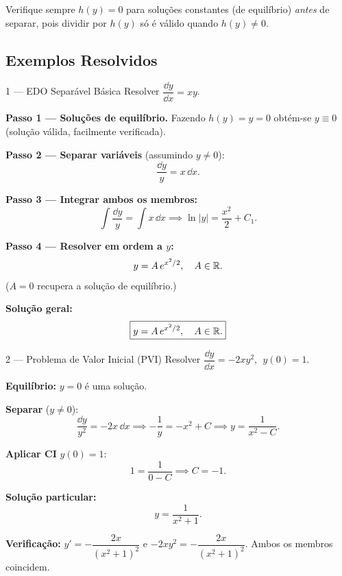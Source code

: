 \begin{tipbox}
  Verifique sempre $h(y)=0$ para soluções constantes (de equilíbrio) \emph{antes} de
  separar, pois dividir por $h(y)$ só é válido quando $h(y)\neq 0$.
\end{tipbox}

\subsection{Exemplos Resolvidos}

\begin{exbox}{1 --- EDO Separável Básica}
  Resolver $\dfrac{\dd y}{\dd x} = xy$.
\end{exbox}

\begin{solbox}
  \textbf{Passo 1 --- Soluções de equilíbrio.} Fazendo $h(y)=y=0$ obtém-se $y\equiv 0$
  (solução válida, facilmente verificada).

  \textbf{Passo 2 --- Separar variáveis} (assumindo $y\neq 0$):
  \[
    \frac{\dd y}{y} = x\,\dd x.
  \]

  \textbf{Passo 3 --- Integrar ambos os membros:}
  \[
    \int \frac{\dd y}{y} = \int x\,\dd x
    \implies \ln|y| = \frac{x^2}{2} + C_1.
  \]

  \textbf{Passo 4 --- Resolver em ordem a $y$:}
  \[
    y = A\,e^{x^2/2}, \quad A\in\mathbb{R}.
  \]
  ($A=0$ recupera a solução de equilíbrio.)

  \textbf{Solução geral:}
  \[
    \boxed{y = A\,e^{x^2/2}, \quad A\in\mathbb{R}.}
  \]
\end{solbox}

\begin{exbox}{2 --- Problema de Valor Inicial (PVI)}
  Resolver $\dfrac{\dd y}{\dd x} = -2xy^2$, $\;y(0) = 1$.
\end{exbox}

\begin{solbox}
  \textbf{Equilíbrio:} $y=0$ é uma solução.

  \textbf{Separar} ($y\neq 0$):
  \[
    \frac{\dd y}{y^2} = -2x\,\dd x
    \implies -\frac{1}{y} = -x^2 + C
    \implies y = \frac{1}{x^2 - C}.
  \]

  \textbf{Aplicar CI} $y(0)=1$:
  \[
    1 = \frac{1}{0 - C} \implies C = -1.
  \]

  \textbf{Solução particular:}
  \[
    \boxed{y = \frac{1}{x^2+1}.}
  \]

  \textbf{Verificação:}
  $y' = -\dfrac{2x}{(x^2+1)^2}$ e $-2xy^2 = -\dfrac{2x}{(x^2+1)^2}$.
  Ambos os membros coincidem. \checkmark
\end{solbox}

